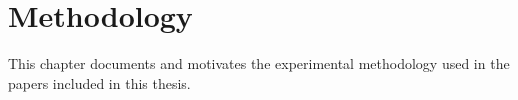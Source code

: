 \documentclass[../main.tex]{subfiles}
\begin{document}
\chapter{Methodology}
\label{chap:methodology}

This chapter documents and motivates the experimental methodology used in the papers included in this thesis. 
\end{document}

